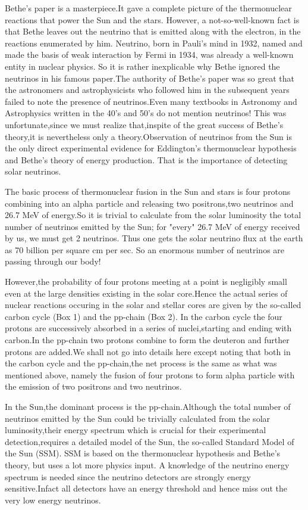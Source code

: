 Bethe's paper is a masterpiece.It gave a  complete
picture of the thermonuclear reactions that power the
Sun and the stars. However, a not-so-well-known fact
is that Bethe leaves out the neutrino that is emitted
along with the electron, in the reactions enumerated
by him. Neutrino, born in Pauli's mind in 1932, named
and made the basis of weak interaction by Fermi in
1934, was already a well-known entity in nuclear
physics. So it is rather inexplicable why Bethe ignored
the neutrinos in his famous paper.The authority of
Bethe's paper was so great that the astronomers and
astrophysicists who followed him in the subsequent
years failed to note the presence of neutrinos.Even
many textbooks in Astronomy and Astrophysics written
in the 40's and 50's do not mention neutrinos! This
was unfortunate,since we must realize that,inspite
of the great success of Bethe's theory,it is
nevertheless only a theory.Observation of neutrinos
from the Sun is the only direct experimental
evidence for Eddington's thermonuclear hypothesis
and Bethe's theory of energy production. That is
the importance of detecting solar neutrinos.

The basic process of thermonuclear fusion in the Sun and stars
is four protons combining into an alpha particle and releasing
two positrons,two neutrinos and 26.7 MeV of energy.So it is
trivial to calculate from the solar luminosity the total
number of neutrinos emitted by the Sun; for "every" 26.7 MeV
of energy received by us, we must get 2 neutrinos.
Thus one gets the
solar neutrino flux at the earth as 70 billion per square
cm per sec. So an enormous number of neutrinos are passing
through our body!

However,the probability of four protons meeting at a point
is negligibly small even at the large densities existing
in the solar core.Hence the actual series of nuclear reactions
occuring in the solar and stellar cores are given by the
so-called carbon cycle (Box 1) and the pp-chain (Box 2).
In the carbon cycle
the four protons are successively absorbed in a series of
nuclei,starting and ending with carbon.In the pp-chain two
protons combine to form the deuteron and further protons
are added.We shall not go into details here except noting that
both in the carbon cycle and the pp-chain,the net process is
the same as what was mentioned above, namely the fusion of
four protons to form alpha particle with the emission of two
positrons and two neutrinos.

In the Sun,the dominant process is the pp-chain.Although the
total number of neutrinos emitted by the Sun could be trivially
calculated from the solar luminosity,their energy spectrum which
is crucial for their experimental detection,requires a detailed
model of the Sun, the so-called Standard Model of the Sun (SSM).
SSM is based on the thermonuclear hypothesis and Bethe's theory,
but uses a lot more physics input.
A knowledge of the neutrino energy spectrum is needed since
the neutrino detectors are strongly energy sensitive.Infact all
detectors have an energy threshold and hence miss out the very
low energy neutrinos.

